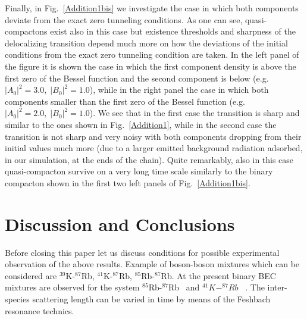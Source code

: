 \documentclass[12pt]{iopart}
\begin{document}
Finally,  in Fig.~\ref{Addition1bis} we investigate the case in which  both components deviate from the exact zero tunneling conditions. As one can see, quasi-compactons exist also in this case but  existence thresholds and sharpness of the delocalizing transition depend much more on how the  deviations of the initial conditions from the exact zero tunneling condition are taken.
In the left panel of the figure it is shown the case in which the first component density is above  the  first zero of the Bessel function and  the second component is below (e.g. $\left|A_{0}\right|^{2}=3.0,\;\left|B_{0}\right|^{2}=1.0$), while in the right panel the case in which  both components smaller than the first zero of the Bessel function (e.g. $\left|A_{0}\right|^{2}=2.0,\;\left|B_{0}\right|^{2}=1.0$). We see that in the first case the transition is sharp and similar to the ones shown in Fig.~\ref{Addition1}, while in the second case the transition is not sharp and very noisy with  both components dropping from  their initial values much more (due to a larger emitted background radiation adsorbed, in our simulation, at the ends of the chain). Quite remarkably, also in this case quasi-compacton  survive on a very long time scale similarly to the binary compacton shown in the first two left panels of Fig.~\ref{Addition1bis}.





\section{Discussion and Conclusions}

Before closing this paper let us discuss conditions for possible experimental
observation of the above results. Example of boson-boson mixtures which can be considered are $^{39}$K-$^{87}$Rb, $^{41}$K-$^{87}$Rb, $^{85}$Rb-$^{87}$Rb.
At the present binary BEC mixtures are observed for the system  $^{85}$Rb-$^{87}$Rb~\cite{Rapp} and  $^{41}K-^{87}Rb$ ~\cite{Inguscio}. The inter-species scattering length can
be varied in time by means of the Feshbach resonance technics.
\end{document}
